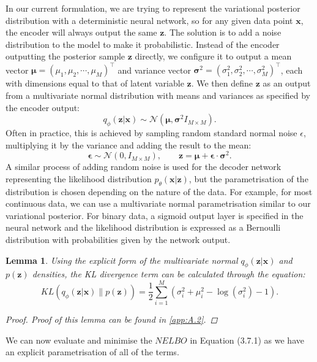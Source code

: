 \documentclass[honours,12pt]{unswthesis}
\newtheorem{lemma}[theorem]{Lemma}
\numberwithin{equation}{section}
\theoremstyle{definition}
\begin{document}
In our current formulation, we are trying to represent the variational posterior distribution with a deterministic neural network, so for any given data point $\bm{x}$, the encoder will always output the same $\bm{z}$. The solution is to add a noise distribution to the model to make it probabilistic. Instead of the encoder outputting the posterior sample $\bm{z}$ directly, we configure it to output a mean vector $\bm{\mu}=(\mu_1,\mu_2,\cdots,\mu_M)^\top$ and variance vector $\bm{\sigma}^2=(\sigma^2_1,\sigma^2_2,\cdots, \sigma^2_M)^\top$, each with dimensions equal to that of latent variable $\bm{z}$. We then define $\bm{z}$ as an output from a multivariate normal distribution with means and variances as specified by the encoder output:
\[q_\phi(\bm{z}|\bm{x})\sim \mathcal{N}(\bm{\mu},\bm{\sigma}^2I_{M\times M}).\]
Often in practice, this is achieved by sampling random standard normal noise $\epsilon$, multiplying it by the variance and adding the result to the mean:
\[\bm{\epsilon}\sim \mathcal{N}(0,I_{M\times M}),\qquad \bm{z}=\bm{\mu}+\bm{\epsilon}\cdot\bm{\sigma}^2.\]
A similar process of adding random noise is used for the decoder network representing the likelihood distribution $p_\theta(\bm{x}|\bm{z})$, but the parametrisation of the distribution is chosen depending on the nature of the data. For example, for most continuous data, we can use a multivariate normal parametrisation similar to our variational posterior. For binary data, a sigmoid output layer is specified in the neural network and the likelihood distribution is expressed as a Bernoulli distribution with probabilities given by the network output.
\begin{lemma}
Using the explicit form of the multivariate normal $q_\phi(\bm{z}|\bm{x})$ and $p(\bm{z})$ densities, the KL divergence term can be calculated through the equation:
\[KL(q_\phi(\bm{z}|\bm{x})\|p(\bm{z}))=\frac12 \sum_{i=1}^M\left(\sigma^2_i+\mu^2_i-\log(\sigma^2_i)-1\right).\]
\begin{proof}
Proof of this lemma can be found in \autoref{app:A.2}.
\end{proof}
\end{lemma}
We can now evaluate and minimise the $NELBO$ in Equation (3.7.1) as we have an explicit parametrisation of all of the terms.
\end{document}
